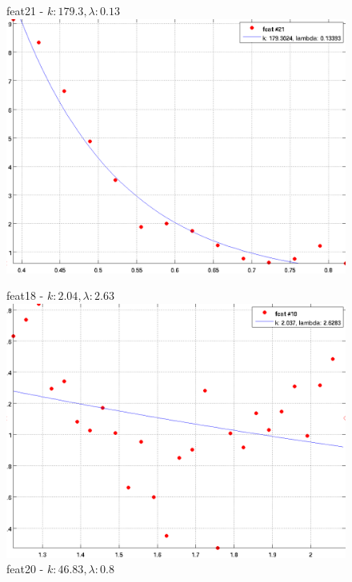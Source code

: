 \documentclass[12pt]{report}
\begin{document}
\begin{figure}[H]
\begin{minipage}[t]{0.5\linewidth}
	feat21 - $k: 179.3, \lambda: 0.13 $\\
	\includegraphics[scale=\imFeat]{images/feat21}\\
\end{minipage}
\begin{minipage}[t]{0.5\linewidth}
	\centering
	feat18 - $k: 2.04, \lambda: 2.63 $\\
	\includegraphics[scale=\imFeat]{images/feat18}\\
	feat20 - $k: 46.83, \lambda: 0.8 $\\

\end{minipage}
\end{figure}
\end{document}
